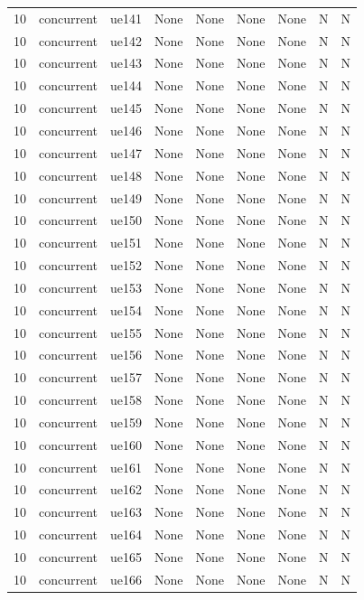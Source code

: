 \begin{table}[ht]
\begin{tabular}{|c|c|c|c|c|c|c|c|c|}
10 & concurrent & ue141 & None & None & None & None & N & N \\
10 & concurrent & ue142 & None & None & None & None & N & N \\
10 & concurrent & ue143 & None & None & None & None & N & N \\
10 & concurrent & ue144 & None & None & None & None & N & N \\
10 & concurrent & ue145 & None & None & None & None & N & N \\
10 & concurrent & ue146 & None & None & None & None & N & N \\
10 & concurrent & ue147 & None & None & None & None & N & N \\
10 & concurrent & ue148 & None & None & None & None & N & N \\
10 & concurrent & ue149 & None & None & None & None & N & N \\
10 & concurrent & ue150 & None & None & None & None & N & N \\
10 & concurrent & ue151 & None & None & None & None & N & N \\
10 & concurrent & ue152 & None & None & None & None & N & N \\
10 & concurrent & ue153 & None & None & None & None & N & N \\
10 & concurrent & ue154 & None & None & None & None & N & N \\
10 & concurrent & ue155 & None & None & None & None & N & N \\
10 & concurrent & ue156 & None & None & None & None & N & N \\
10 & concurrent & ue157 & None & None & None & None & N & N \\
10 & concurrent & ue158 & None & None & None & None & N & N \\
10 & concurrent & ue159 & None & None & None & None & N & N \\
10 & concurrent & ue160 & None & None & None & None & N & N \\
10 & concurrent & ue161 & None & None & None & None & N & N \\
10 & concurrent & ue162 & None & None & None & None & N & N \\
10 & concurrent & ue163 & None & None & None & None & N & N \\
10 & concurrent & ue164 & None & None & None & None & N & N \\
10 & concurrent & ue165 & None & None & None & None & N & N \\
10 & concurrent & ue166 & None & None & None & None & N & N \\

\end{tabular}
\end{table}
